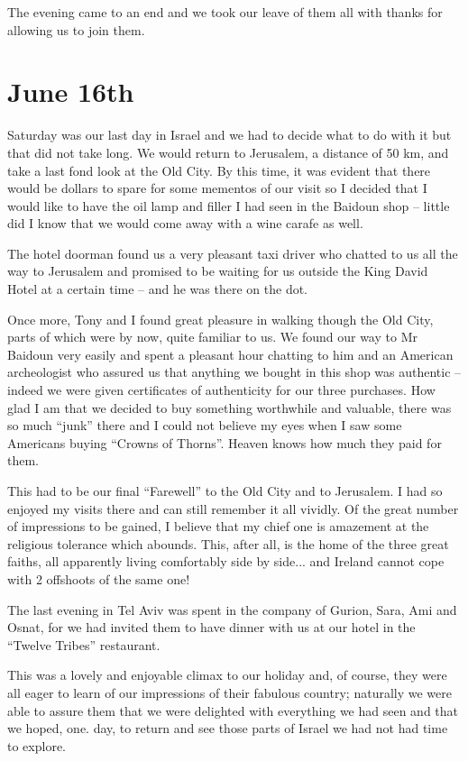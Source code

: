 The evening came to an end and we took our leave of them all with
thanks for allowing us to join them.


\section{June 16th}

Saturday was our last day in Israel and we had to decide what to do
with it but that did not take long. We would return to Jerusalem, a
distance of 50 km, and take a last fond look at the Old City. By this
time, it was evident that there would be dollars to spare for some
mementos of our visit so I decided that I would like to have the oil
lamp and filler I had seen in the Baidoun shop -- little did I know
that we would come away with a wine carafe as well.

The hotel doorman found us a very pleasant taxi driver who chatted to
us all the way to Jerusalem and promised to be waiting for us outside
the King David Hotel at a certain time -- and he was there on the dot.

Once more, Tony and I found great pleasure in walking though the Old
City, parts of which were by now, quite familiar to us. We found our
way to Mr Baidoun very easily and spent a pleasant hour chatting to
him and an American archeologist who assured us that anything we
bought in this shop was authentic -- indeed we were given certificates
of authenticity for our three purchases. How glad I am that we decided
to buy something worthwhile and valuable, there was so much ``junk''
there and I could not believe my eyes when I saw some Americans buying
``Crowns of Thorns''. Heaven knows how much they paid for them.

This had to be our final ``Farewell'' to the Old City and to
Jerusalem. I had so enjoyed my visits there and can still remember it
all vividly. Of the great number of impressions to be gained, I
believe that my chief one is amazement at the religious tolerance
which abounds. This, after all, is the home of the three great faiths,
all apparently living comfortably side by side... and Ireland cannot
cope with 2 offshoots of the same one!

The last evening in Tel Aviv was spent in the company of Gurion, Sara,
Ami and Osnat, for we had invited them to have dinner with us at our
hotel in the ``Twelve Tribes'' restaurant.

This was a lovely and enjoyable climax to our holiday and, of course,
they were all eager to learn of our impressions of their fabulous
country; naturally we were able to assure them that we were delighted
with everything we had seen and that we hoped, one. day, to return and
see those parts of Israel we had not had time to explore.

